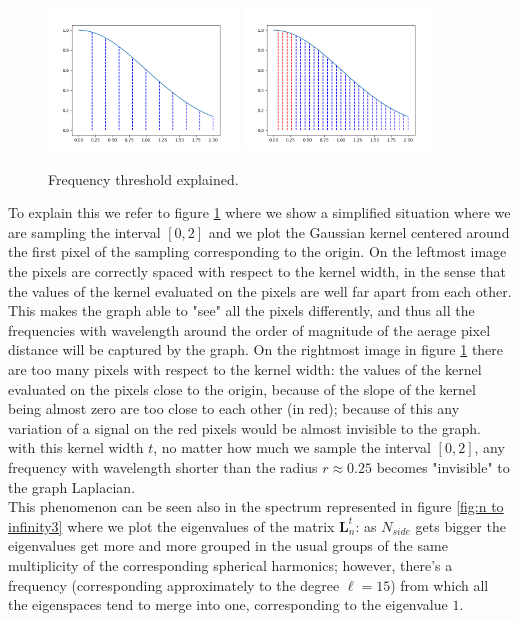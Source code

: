 \begin{figure}[h!]
	\label{fig:n to infinity4}
	\centering
	\includegraphics[width=0.45\textwidth]{figs/chapter1/frequency_threshold1.png}	\hfill
	\includegraphics[width=0.45\textwidth]{figs/chapter1/frequency_threshold2.png}	
	\caption{Frequency threshold explained.}
\end{figure}

 To explain this we refer to figure \ref{fig:n to infinity4} where we show a simplified situation where we are sampling the interval $[0, 2]$ and we plot the Gaussian kernel centered around the first pixel of the sampling corresponding to the origin. On the leftmost image the pixels are correctly spaced with respect to the kernel width, in the sense that the values of the kernel evaluated on the pixels are well far apart from each other. This makes the graph able to "see" all the pixels differently, and thus all the frequencies with wavelength around the order of magnitude of the aerage pixel distance will be captured by the graph. On the rightmost image in figure \ref{fig:n to infinity4} there are too many pixels with respect to the kernel width: the values of the kernel evaluated on the pixels close to the origin, because of the slope of the kernel being almost zero are too close to each other (in red); because of this any variation of a signal on the red pixels would be almost invisible to the graph. with this kernel width $t$, no matter how much we sample the interval $[0,2]$, any frequency with wavelength shorter than the radius $r\approx0.25$ becomes "invisible" to the graph Laplacian.\\
 This phenomenon can be seen also in the spectrum represented in figure \ref{fig:n to infinity3} where we plot the eigenvalues of the matrix $\mathbf L_n^t$: as $N_{side}$ gets bigger the eigenvalues get more and more grouped in the usual groups of the same multiplicity of the corresponding spherical harmonics; however, there's a frequency (corresponding approximately to the degree $\ell=15$) from which all the eigenspaces tend to merge into one, corresponding to the eigenvalue $1$.
 
